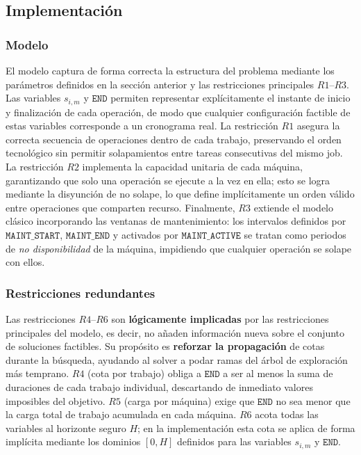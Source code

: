 
\subsection{Implementación}\label{sec:01-jobshop_mantenimiento-implementacion}

\subsubsection*{Modelo}
El modelo captura de forma correcta la estructura del problema mediante los parámetros definidos en la sección anterior y las restricciones principales \(R1\)–\(R3\).
Las variables \(s_{i,m}\) y \(\texttt{END}\) permiten representar explícitamente el instante de inicio y finalización de cada operación, de modo que cualquier configuración factible de estas variables corresponde a un cronograma real.
La restricción \(R1\) asegura la correcta secuencia de operaciones dentro de cada trabajo, preservando el orden tecnológico sin permitir solapamientos entre tareas consecutivas del mismo job.
La restricción \(R2\) implementa la capacidad unitaria de cada máquina, garantizando que solo una operación se ejecute a la vez en ella; esto se logra mediante la disyunción de no solape, lo que define implícitamente un orden válido entre operaciones que comparten recurso.
Finalmente, \(R3\) extiende el modelo clásico incorporando las ventanas de mantenimiento: los intervalos definidos por \(\texttt{MAINT\_START}\), \(\texttt{MAINT\_END}\) y activados por \(\texttt{MAINT\_ACTIVE}\) se tratan como periodos de \textit{no disponibilidad} de la máquina, impidiendo que cualquier operación se solape con ellos.

\subsubsection*{Restricciones redundantes}
Las restricciones \(R4\)–\(R6\) son \textbf{lógicamente implicadas} por las restricciones principales del modelo, es decir, no añaden información nueva sobre el conjunto de soluciones factibles. Su propósito es \textbf{reforzar la propagación} de cotas durante la búsqueda, ayudando al solver a podar ramas del árbol de exploración más temprano.
\(R4\) (cota por trabajo) obliga a \(\texttt{END}\) a ser al menos la suma de duraciones de cada trabajo individual, descartando de inmediato valores imposibles del objetivo.
\(R5\) (carga por máquina) exige que \(\texttt{END}\) no sea menor que la carga total de trabajo acumulada en cada máquina.
\(R6\) acota todas las variables al horizonte seguro \(H\); en la implementación esta cota se aplica de forma implícita mediante los dominios \([0,H]\) definidos para las variables \(s_{i,m}\) y \(\texttt{END}\).


